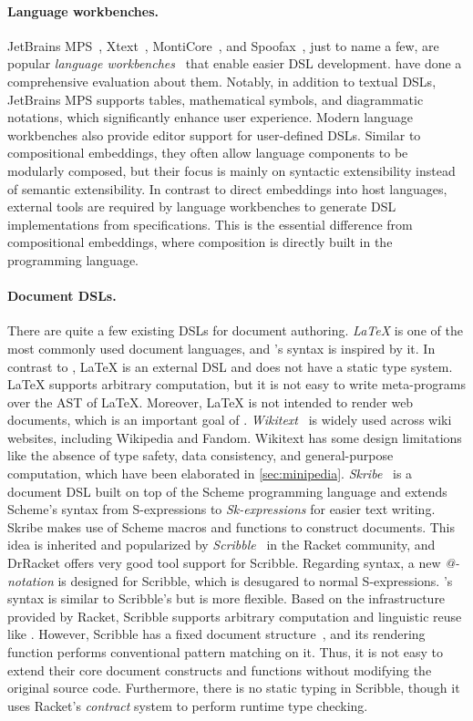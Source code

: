 \paragraph{Language workbenches.}
JetBrains MPS~\citep{mps}, Xtext~\citep{xtext},
MontiCore~\citep{krahn2010monticore}, and Spoofax~\citep{kats2010spoofax}, just
to name a few, are popular \emph{language
workbenches}~\citep{fowler2005language} that enable easier DSL development.
\citet{erdweg2015evaluating} have done a comprehensive evaluation about them.
Notably, in addition to textual DSLs, JetBrains MPS supports tables,
mathematical symbols, and diagrammatic notations, which significantly enhance
user experience. Modern language workbenches also provide editor support for
user-defined DSLs. Similar to compositional embeddings, they often allow
language components to be modularly composed, but their focus is mainly on
syntactic extensibility instead of semantic extensibility. In contrast to direct
embeddings into host languages, external tools are required by language
workbenches to generate DSL implementations from specifications. This is the
essential difference from compositional embeddings, where composition is
directly built in the programming language.

\paragraph{Document DSLs.}
There are quite a few existing DSLs for document authoring. \emph{\LaTeX} is one
of the most commonly used document languages, and \ExT's syntax is inspired by
it. In contrast to \ExT, \LaTeX{} is an external DSL and does not have a static
type system. \LaTeX{} supports arbitrary computation, but it is not easy to
write meta-programs over the AST of \LaTeX. Moreover, \LaTeX{} is not intended
to render web documents, which is an important goal of \ExT.
\emph{Wikitext}~\citep{wikitext} is widely used across wiki websites, including
Wikipedia and Fandom. Wikitext has some design limitations like the absence of
type safety, data consistency, and general-purpose computation, which have been
elaborated in \autoref{sec:minipedia}. \emph{Skribe}~\citep{gallesio2005skribe}
is a document DSL built on top of the Scheme programming language and extends
Scheme's syntax from S-expressions to \emph{Sk-expressions} for easier text
writing. Skribe makes use of Scheme macros and functions to construct documents.
This idea is inherited and popularized by
\emph{Scribble}~\citep{flatt2009scribble} in the Racket community, and DrRacket
offers very good tool support for Scribble. Regarding syntax, a new
\emph{@-notation} is designed for Scribble, which is desugared to normal
S-expressions. \ExT's syntax is similar to Scribble's but is more flexible.
Based on the infrastructure provided by Racket, Scribble supports arbitrary
computation and linguistic reuse like \ExT. However, Scribble has a fixed
document structure~\citep{scribble}, and its rendering function performs
conventional pattern matching on it. Thus, it is not easy to extend their core
document constructs and functions without modifying the original source code.
Furthermore, there is no static typing in Scribble, though it uses Racket's
\emph{contract} system to perform runtime type checking.

